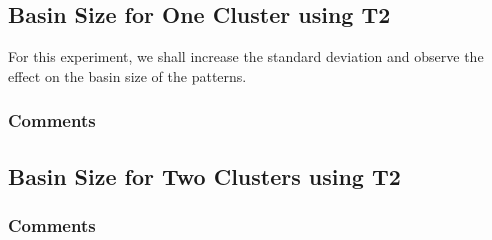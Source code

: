 \subsection{Basin Size for One Cluster using T2}

For this experiment, we shall increase the standard deviation and observe the effect on the basin size of the patterns.


\subsubsection{Comments}

\subsection{Basin Size for Two Clusters using T2}

\subsubsection{Comments}
\\







